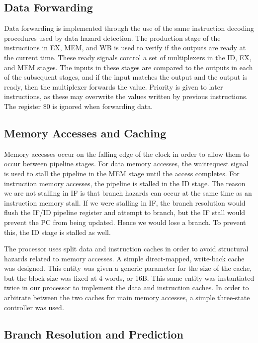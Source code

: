 \documentclass[conference, hidelinks]{IEEEtran}
\begin{document}
\subsection{Data Forwarding}

Data forwarding is implemented through the use of the same instruction decoding procedures used by data hazard detection. The production stage of the instructions in EX, MEM, and WB is used to verify if the outputs are ready at the current time. These ready signals control a set of multiplexers in the ID, EX, and MEM stages. The inputs in these stages are compared to the outputs in each of the subsequent stages, and if the input matches the output and the output is ready, then the multiplexer forwards the value. Priority is given to later instructions, as these may overwrite the values written by previous instructions. The register \$0 is ignored when forwarding data.

\subsection{Memory Accesses and Caching}

Memory accesses occur on the falling edge of the clock in order to allow them to occur between pipeline stages. For data memory accesses, the waitrequest signal is used to stall the pipeline in the MEM stage until the access completes. For instruction memory accesses, the pipeline is stalled in the ID stage. The reason we are not stalling in IF is that branch hazards can occur at the same time as an instruction memory stall. If we were stalling in IF, the branch resolution would flush the IF/ID pipeline register and attempt to branch, but the IF stall would prevent the PC from being updated. Hence we would lose a branch. To prevent this, the ID stage is stalled as well.

The processor uses split data and instruction caches in order to avoid structural hazards related to memory accesses. A simple direct-mapped, write-back cache was designed. This entity was given a generic parameter for the size of the cache, but the block size was fixed at 4 words, or 16B. This same entity was instantiated twice in our processor to implement the data and instruction caches. In order to arbitrate between the two caches for main memory accesses, a simple three-state controller was used.

\subsection{Branch Resolution and Prediction}
\end{document}
